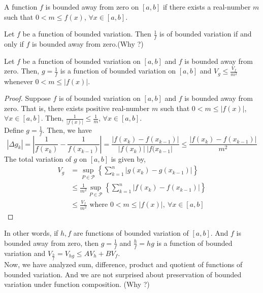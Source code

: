 \begin{definition}
	A function $f$ is bounded away from zero on $[a,b]$ if there exists a real-number $m$ such that $0 < m \le f(x)$, $\forall x \in [a,b]$.
\end{definition}

\begin{commentary}
	Let $f$ be a function of bounded variation.
	Then $\frac{1}{f}$ is of bounded variation if and only if $f$ is bounded away from zero.(Why ?)
\end{commentary}

\begin{theorem}
	Let $f$ be a function of bounded variation on $[a,b]$ and $f$ is bounded away from zero.
	Then, $g = \frac{1}{f}$ is a function of bounded variation on $[a,b]$ and $V_g \le \frac{V_f}{m^2}$ whenever $0 < m \le |f(x)|$.
\end{theorem}
\begin{proof}
	Suppose $f$ is of bounded variation on $[a,b]$ and $f$ is bounded away from zero.
	That is, there exists positive real-number $m$ such that $0 < m \le |f(x)|$, $\forall x \in [a,b]$.
	Then, $\frac{1}{|f(x)|} \le \frac{1}{m}$, $\forall x \in [a,b]$.\\

	Define $g = \frac{1}{f}$.
	Then, we have
	\[ |\Delta g_k| = \left| \frac{1}{f(x_k)} - \frac{1}{f(x_{k-1})} \right| = \frac{|f(x_k)-f(x_{k-1})|}{|f(x_k)|\ |f(x_{k-1}|} \le \frac{|f(x_k)-f(x_{k-1})|}{m^2} \]
	The total variation of $g$ on $[a,b]$ is given by,
	\begin{align*}
		V_g & = \sup_{P \in \mathscr{P}} \left\{ \sum_{k=1}^n |g(x_k)-g(x_{k-1})| \right\} \\
		& \le \frac{1}{m^2} \sup_{P \in \mathscr{P}} \left\{ \sum_{k=1}^n |f(x_k)-f(x_{k-1})| \right\} \\
		& \le \frac{V_f}{m^2} \text{ where } 0 < m \le |f(x)|,\ \forall x \in [a,b]
	\end{align*}
\end{proof}
\begin{commentary}
	In other words, if $h,f$ are functions of bounded variation of $[a,b]$.
	And $f$ is bounded away from zero, then $g = \frac{1}{f}$ and $\frac{h}{f} = hg$ is a function of bounded variation and $V_{\frac{h}{f}} = V_{hg} \le AV_h + BV_f$.\\

	Now, we have analyzed sum, difference, product and quotient of functions of bounded variation.
	And we are not surprised about preservation of bounded variation under function composition. (Why ?)
\end{commentary}
